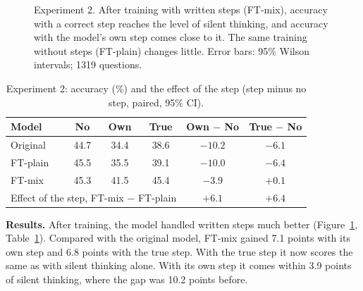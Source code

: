 \documentclass[10pt,letterpaper]{article}
\begin{document}
\begin{figure}[t]
\centering
{}
\caption{Experiment 2. After training with written steps (FT-mix), accuracy with a correct step reaches the level of
silent thinking, and accuracy with the model's own step comes close to it. The same training without steps
(FT-plain) changes little. Error bars: 95\% Wilson intervals; 1319 questions.}
\label{fig:ft}
\end{figure}

\begin{table}[t]
\begin{center}
\caption{Experiment 2: accuracy (\%) and the effect of the step (step minus no step, paired, 95\% CI).}
\label{tab:ft}
\vskip 0.08in
\footnotesize
\begin{tabular}{lccccc}
\toprule
Model & No & Own & True & Own $-$ No & True $-$ No \\
\midrule
Original & 44.7 & 34.4 & 38.6 & $-10.2$ & $-6.1$ \\
FT-plain & 45.5 & 35.5 & 39.1 & $-10.0$ & $-6.4$ \\
FT-mix & 45.3 & 41.5 & 45.4 & $-3.9$ & $+0.1$  \\
\midrule
\multicolumn{4}{l}{Effect of the step, FT-mix $-$ FT-plain} & $+6.1$ & $+6.4$ \\
\bottomrule
\end{tabular}
\end{center}
\end{table}
\noindent
\textbf{Results.} After training, the model handled written steps much better (Figure~\ref{fig:ft},
Table~\ref{tab:ft}). Compared with the original model, FT-mix gained 7.1 points with its own step and 6.8
points with the true step. With the true step it now scores the same as with silent thinking alone. With its own step it comes within 3.9 points of silent thinking, where the gap was 10.2 points before.
\end{document}
